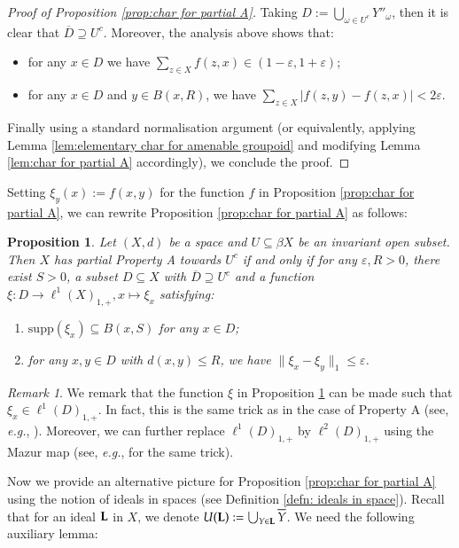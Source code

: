 \documentclass[12pt, a4paper]{amsart}
\numberwithin{equation}{section}
\newtheorem{prop}[thm]{Proposition}
\newenvironment{propbis}[1]
  {\renewcommand{\thethm}{\ref{#1}$'$}%
   \addtocounter{thm}{-1}%
   \begin{prop}}
  {\end{prop}}
\theoremstyle{definition}
\theoremstyle{remark}
\newtheorem{rem}[thm]{Remark}
\def\L{\mathcal{L}}
\def\supp{\mathrm{supp}}
\def\L{{\bf L}}
\begin{document}
\begin{proof}[Proof of Proposition \ref{prop:char for partial A}]
Taking $D:=\bigcup_{\omega \in U^c} Y''_\omega$, then it is clear that $\overline{D} \supseteq U^c$. Moreover, the analysis above shows that:
\begin{itemize}
 \item for any $x\in D$ we have $\sum_{z\in X} f(z,x) \in (1-\varepsilon, 1+\varepsilon)$;
 \item for any $x\in D$ and $y\in B(x,R)$, we have $\sum_{z\in X}  |f(z, y) - f(z, x)| < 2\varepsilon$.
\end{itemize}
Finally using a standard normalisation argument (or equivalently, applying Lemma \ref{lem:elementary char for amenable groupoid} and modifying Lemma \ref{lem:char for partial A} accordingly), we conclude the proof.
\end{proof}


Setting $\xi_y(x):=f(x,y)$ for the function $f$ in Proposition \ref{prop:char for partial A}, we can rewrite Proposition \ref{prop:char for partial A} as follows:

\begin{propbis}{prop:char for partial A}\label{prop:char for partial A II}
Let $(X,d)$ be a space and $U \subseteq \beta X$ be an invariant open subset. Then $X$ has partial Property A towards $U^c$ \emph{if and only if} for any $\varepsilon, R>0$, there exist $S>0$, a subset $D \subseteq X$ with $\overline{D} \supseteq U^c$ and a function $\xi: D \to \ell^1(X)_{1,+}, x \mapsto \xi_x$ satisfying:
\begin{enumerate}
  \item $\supp(\xi_x) \subseteq B(x,S)$ for any $x\in D$;
  \item for any $x, y\in D$ with $d(x,y) \leq R$, we have $\|\xi_x - \xi_y\|_1 \leq \varepsilon$.
\end{enumerate}
\end{propbis}

\begin{rem}\label{rem:mod for char}
We remark that the function $\xi$ in Proposition \ref{prop:char for partial A II} can be made such that $\xi_x \in \ell^1(D)_{1,+}$. In fact, this is the same trick as in the case of Property A (see, \emph{e.g.}, \cite[Proposition 4.2.5]{NY12}). Moreover, we can further replace $\ell^1(D)_{1,+}$ by $\ell^2(D)_{1,+}$ using the Mazur map (see, \emph{e.g.}, \cite[Proposition 1.2.4]{Wil09} for the same trick).
\end{rem}



Now we provide an alternative picture for Proposition \ref{prop:char for partial A} using the notion of ideals in spaces (see Definition \ref{defn: ideals in space}). Recall that for an ideal $\L$ in $X$, we denote $U(\L):= \bigcup_{Y \in \L} \overline{Y}$. We need the following auxiliary lemma:
\end{document}
